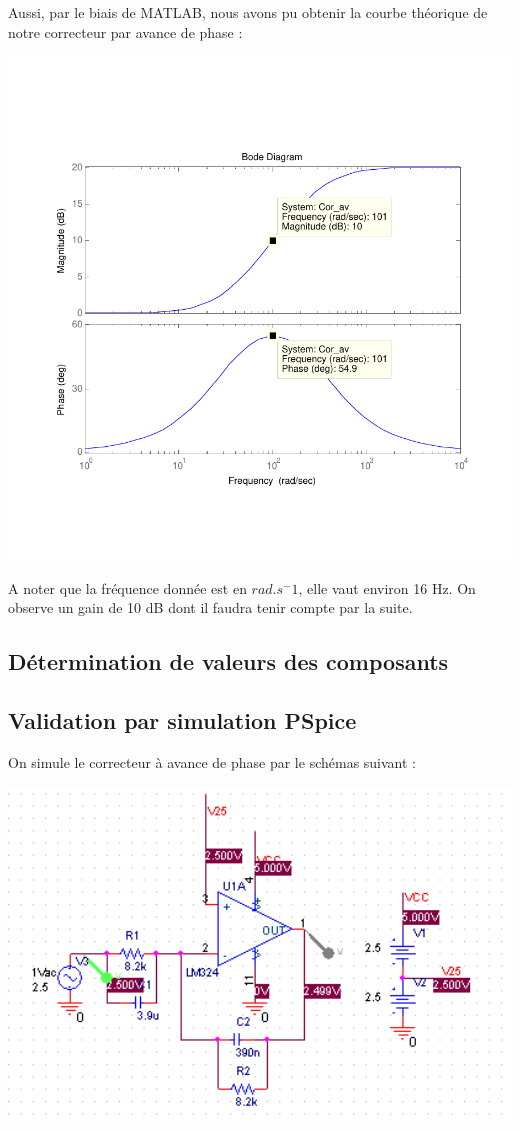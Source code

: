 \documentclass[11pt, french]{article} %
\begin{document}
Aussi, par le biais de MATLAB, nous avons pu obtenir la courbe théorique de notre correcteur par avance de phase :

\begin{center}
\includegraphics[scale = 0.8]{SolutionAnalogique/BodeAvPhase.pdf} 
\end{center}

A noter que la fréquence donnée est en $rad.s^-1$, elle vaut environ 16 Hz. On observe un gain de 10 dB dont il faudra tenir compte par la suite. 
\subsection{Détermination de valeurs des composants}


\subsection{Validation par simulation PSpice}

On simule le correcteur à avance de phase par le schémas suivant : 

\begin{center}
\includegraphics[width = 15cm]{SolutionAnalogique/schAvph.png} 
\end{center}
\end{document}
